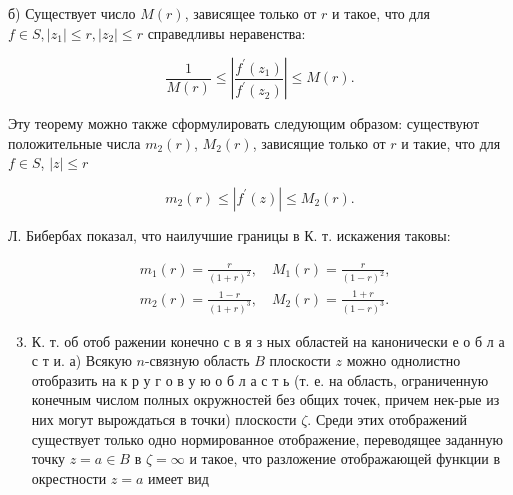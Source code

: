 \documentclass[10pt]{article}
\begin{document}
б) Существует число $M(r)$, зависящее только от $r$ и такое, что для $f \in S,\left|z_{1}\right| \leqslant r,\left|z_{2}\right| \leqslant r$ справедливы неравенства:



\[

\frac{1}{M(r)} \leqslant\left|\frac{f^{\prime}\left(z_{1}\right)}{f^{\prime}\left(z_{2}\right)}\right| \leqslant M(r) .

\]



Эту теорему можно также сформулировать следующим образом: существуют положительные числа $m_{2}(r)$, $M_{2}(r)$, зависящие только от $r$ и такие, что для $f \in S$, $|z| \leqslant r$



\[

m_{2}(r) \leqslant\left|f^{\prime}(z)\right| \leqslant M_{2}(r) .

\]



Л. Бибербах показал, что наилучшие границы в К. т. искажения таковы:



\[

\begin{aligned}

& m_{1}(r)=\frac{r}{(1+r)^{2}}, \quad M_{1}(r)=\frac{r}{(1-r)^{2}}, \\

& m_{2}(r)=\frac{1-r}{(1+r)^{3}}, \quad M_{2}(r)=\frac{1+r}{(1-r)^{3}} .

\end{aligned}

\]



\begin{enumerate}

  \setcounter{enumi}{2}

  \item К. т. об отоб ражении конечно с в я з ных областей на канонически е о б л а с т и. а) Всякую $n$-связную область $B$ плоскости $z$ можно однолистно отобразить на к р у г о в у ю о б л а с т ь (т. е. на область, ограниченную конечным числом полных окружностей без общих точек, причем нек-рые из них могут вырождаться в точки) плоскости $\zeta$. Среди этих отображений существует только одно нормированное отображение, переводящее заданную точку $z=a \in B$ в $\zeta=\infty$ и такое, что разложение отображающей функции в окрестности $z=a$ имеет вид

\end{enumerate}
\end{document}
